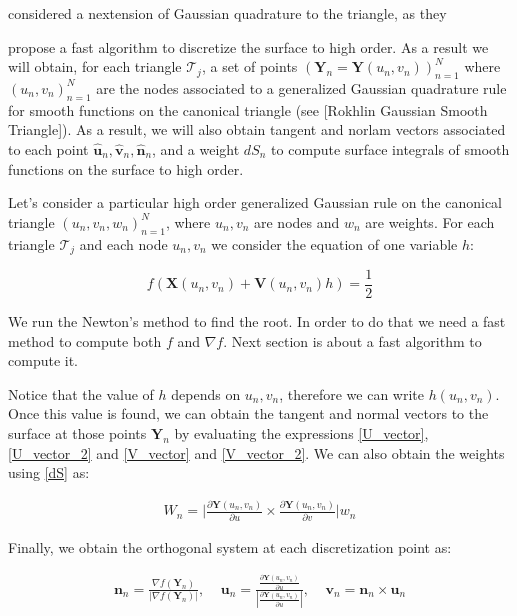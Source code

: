\documentclass[11pt]{article}
\numberwithin{equation}{section}
\newcommand\bn{\boldsymbol n}
\newcommand\bX{\boldsymbol X}
\newcommand\bY{\boldsymbol Y}
\newcommand\bV{\boldsymbol V}
\newcommand\bu{\boldsymbol u}
\newcommand\bv{\boldsymbol v}
\begin{document}
considered a nextension of Gaussian quadrature to the triangle, as
they 


propose a fast algorithm to discretize the surface
to high order. As a result we will obtain, for each triangle
$\mathcal{T}_j$, a set of points $(\bY_n=\bY(u_n,v_n))_{n=1}^N$ where
$(u_n,v_n)_{n=1}^N$ are the nodes associated to a generalized Gaussian
quadrature rule for smooth functions on the canonical triangle (see
[Rokhlin Gaussian Smooth Triangle]). As a result, we will also obtain
tangent and norlam vectors associated to each point
$\hat{\bu}_n,\hat{\bv}_n,\hat{\bn}_n$, and a weight $dS_n$ to compute
surface integrals of smooth functions on the surface to high order.

Let's consider a particular high order generalized Gaussian rule on
the canonical triangle $(u_n,v_n,w_n)_{n=1}^N$, where $u_n,v_n$ are
nodes and $w_n$ are weights. For each triangle $\mathcal{T}_j$ and
each node $u_n,v_n$ we consider the equation of one variable $h$:

\begin{equation}\label{newtoneq}
f(\bX(u_n,v_n)+\bV(u_n,v_n)h)=\frac{1}{2}
\end{equation}

We run the Newton's method to find the root. In order to do that we need a fast method to compute both $f$ and $\nabla f$. Next section is about a fast algorithm to compute it.

Notice that the value of $h$ depends on $u_n,v_n$, therefore we can write $h(u_n,v_n)$. Once this value is found, we can obtain the tangent and normal vectors to the surface at those points $\bY_n$ by evaluating the expressions \ref{U_vector}, \ref{U_vector_2} and \ref{V_vector} and \ref{V_vector_2}. We can also obtain the weights using \ref{dS} as:

\begin{equation}\label{dS_n}
\begin{aligned}
 W_n=\Bigg|\frac{\partial\bY(u_n,v_n)}{\partial u}\times\frac{\partial\bY(u_n,v_n)}{\partial v}\Bigg|w_n
\end{aligned}
\end{equation}

Finally, we obtain the orthogonal system at each discretization point as:

\begin{equation}
\begin{aligned}
\bn_n=\frac{\nabla f(\bY_n)}{|\nabla f(\bY_n)|},\  \  \  \   \ 
\bu_n=\frac{\frac{\partial\bY(u_n,v_n)}{\partial u}}{|\frac{\partial\bY(u_n,v_n)}{\partial u}|},\  \  \  \   \
\bv_n=\bn_n\times\bu_n
\end{aligned}
\end{equation}
\end{document}
